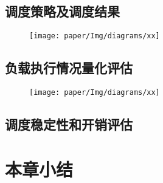     \subsection{调度策略及调度结果}\label{subsec:strategies_and_schedules}
    \begin{figure}[!htbp]
        \centering
        \texttt{[image: paper/Img/diagrams/xx]}
        \bicaption{\quad }
        {\quad }
        \label{fig:xx}
    \end{figure}
    \subsection{负载执行情况量化评估}\label{subsec:quantified_comparison}
    \begin{figure}[!htbp]
        \centering
        \texttt{[image: paper/Img/diagrams/xx]}
        \bicaption{\quad }
        {\quad }
        \label{fig:xx}
    \end{figure}

    \subsection{调度稳定性和开销评估}\label{subsec:scheduling_stability_and_costs_analysis}

\section{本章小结}\label{sec:RAA_summary}

